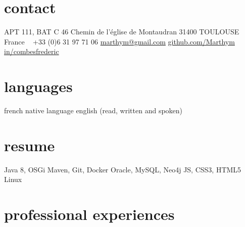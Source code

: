 \documentclass{friggeri-cv} 	%
\begin{document}


\begin{aside} %
\section{contact}
APT 111, BAT C
46 Chemin de l’église de Montaudran
31400 TOULOUSE
France
~
+33 (0)6 31 97 71 06
\href{mailto:marthym@gmail.com}{marthym@gmail.com}
\href{https://github.com/Marthym}{github.com/Marthym}
\href{https://www.linkedin.com/in/combesfrederic}{in/combesfrederic}
\section{languages}
french native language
english (read, written and spoken)
\section{resume}
Java 8, OSGi
Maven, Git, Docker
Oracle, MySQL, Neo4j
JS, CSS3, HTML5
Linux
\end{aside}

\section{professional experiences}
\end{document}
